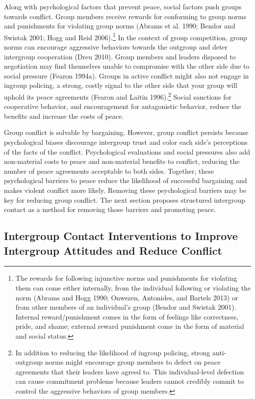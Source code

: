 \documentclass[11pt]{article}
\begin{document}
Along with psychological factors that prevent peace, social factors push
groups towards conflict. Group members receive rewards for conforming to
group norms and punishments for violating group norms (Abrams et al.
1990; Bendor and Swistak 2001; Hogg and Reid 2006).\footnote{The rewards
  for following injunctive norms and punishments for violating them can
  come either internally, from the individual following or violating the
  norm (Abrams and Hogg 1990; Onwezen, Antonides, and Bartels 2013) or
  from other members of an individual's group (Bendor and Swistak 2001).
  Internal reward/punishment comes in the form of feelings like
  correctness, pride, and shame; external reward punishment come in the
  form of material and social status.} In the context of group
competition, group norms can encourage aggressive behaviors towards the
outgroup and deter intergroup cooperation (Dreu 2010). Group members and
leaders disposed to negotiation may find themselves unable to compromise
with the other side due to social pressure (Fearon 1994a). Groups in
active conflict might also not engage in ingroup policing, a strong,
costly signal to the other side that your group will uphold its peace
agreements (Fearon and Laitin 1996).\footnote{In addition to reducing
  the likelihood of ingroup policing, strong anti-outgroup norms might
  encourage group members to defect on peace agreements that their
  leaders have agreed to. This individual-level defection can cause
  commitment problems because leaders cannot credibly commit to control
  the aggressive behaviors of group members.} Social sanctions for
cooperative behavior, and encouragement for antagonistic behavior,
reduce the benefits and increase the costs of peace.

Group conflict is solvable by bargaining. However, group conflict
persists because psychological biases discourage intergroup trust and
color each side's perceptions of the facts of the conflict.
Psychological evaluations and social pressures also add non-material
costs to peace and non-material benefits to conflict, reducing the
number of peace agreements acceptable to both sides. Together, these
psychological barriers to peace reduce the likelihood of successful
bargaining and makes violent conflict more likely. Removing these
psychological barriers may be key for reducing group conflict. The next
section proposes structured intergroup contact as a method for removing
those barriers and promoting peace.

\hypertarget{intergroup-contact-interventions-to-improve-intergroup-attitudes-and-reduce-conflict}{%
\subsection{Intergroup Contact Interventions to Improve Intergroup
Attitudes and Reduce
Conflict}\label{intergroup-contact-interventions-to-improve-intergroup-attitudes-and-reduce-conflict}}
\end{document}
